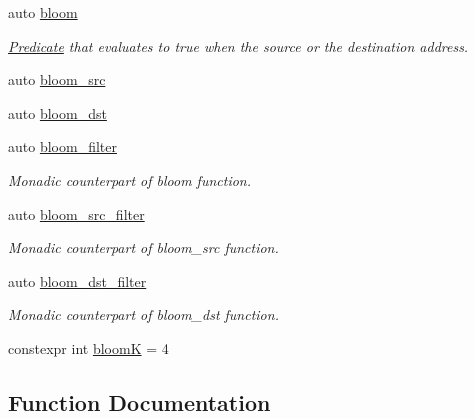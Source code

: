 \begin{DoxyCompactItemize}
auto \hyperlink{namespacepfq_1_1lang_1_1anonymous__namespace_02default_8hpp_03_abfcd230137acb93cfd99f7a0a7c1f17f}{bloom}
\begin{DoxyCompactList}\small\item\em \hyperlink{structpfq_1_1lang_1_1Predicate}{Predicate} that evaluates to {\ttfamily true} when the source or the destination address. \end{DoxyCompactList}\item 
auto \hyperlink{namespacepfq_1_1lang_1_1anonymous__namespace_02default_8hpp_03_aa2a8ff506d61e93d8eca4419513970f4}{bloom\+\_\+src}
\item 
auto \hyperlink{namespacepfq_1_1lang_1_1anonymous__namespace_02default_8hpp_03_ac1c667000a13acfbda8490d5748b91c4}{bloom\+\_\+dst}
\item 
auto \hyperlink{namespacepfq_1_1lang_1_1anonymous__namespace_02default_8hpp_03_a3a5eda5d7a49e279941725df8388378d}{bloom\+\_\+filter}
\begin{DoxyCompactList}\small\item\em Monadic counterpart of {\ttfamily bloom} function. \end{DoxyCompactList}\item 
auto \hyperlink{namespacepfq_1_1lang_1_1anonymous__namespace_02default_8hpp_03_a04d4dfefacab3230f7d17f0f797cd37e}{bloom\+\_\+src\+\_\+filter}
\begin{DoxyCompactList}\small\item\em Monadic counterpart of {\ttfamily bloom\+\_\+src} function. \end{DoxyCompactList}\item 
auto \hyperlink{namespacepfq_1_1lang_1_1anonymous__namespace_02default_8hpp_03_a71aa2d21ceb343786b3911801eb0741b}{bloom\+\_\+dst\+\_\+filter}
\begin{DoxyCompactList}\small\item\em Monadic counterpart of {\ttfamily bloom\+\_\+dst} function. \end{DoxyCompactList}\item 
constexpr int \hyperlink{namespacepfq_1_1lang_1_1anonymous__namespace_02default_8hpp_03_a56750cdea1537acfa24c256b64924004}{bloomK} = 4
\end{DoxyCompactItemize}


\subsection{Function Documentation}
